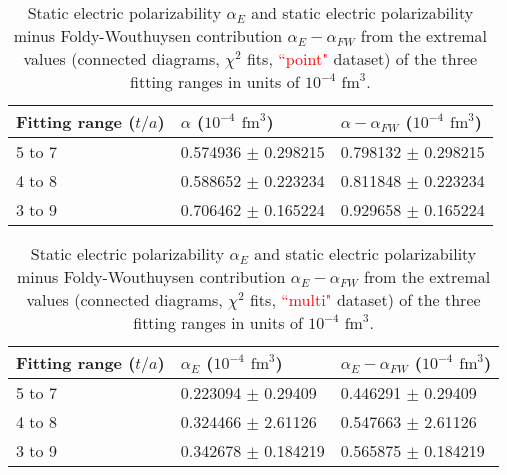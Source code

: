 \begin{table}[H]
\begin{center}
    \begin{tabular}{ | p{2cm}  | p{4cm} | p{4cm} | }
    \hline
     Fitting range ($t/a$) & $\alpha$ ($10^{-4}$ $\text{fm}^3$)    & $\alpha-\alpha_{FW}$ ($10^{-4}$ $\text{fm}^3$)       \\ 
     \hline
     5 to 7 &    0.574936 $\pm$ 0.298215      &   0.798132 $\pm$ 0.298215           \\ \hline
     4 to 8 &   0.588652 $\pm$ 0.223234       &    0.811848 $\pm$ 0.223234          \\ \hline
     3 to 9 &  0.706462 $\pm$ 0.165224        &     0.929658 $\pm$ 0.165224          \\ \hline
    \end{tabular}
\end{center}
\caption{Static electric polarizability  $\alpha_E$ and static electric polarizability minus 
Foldy-Wouthuysen contribution $\alpha_E-\alpha_{FW}$ from the extremal values 
(connected diagrams, $\chi^2$ fits, \textcolor{red}{``point"} dataset) of the three fitting 
ranges in units of $10^{-4}$ $\text{fm}^3$.}
\label{tab:ConnectedPolarizabilitiesPoint}
\end{table}

\begin{table}[H]
\begin{center}
    \begin{tabular}{ | p{2cm}  | p{4cm} | p{4cm} | }
    \hline
     Fitting range ($t/a$) & $\alpha_E$ ($10^{-4}$ $\text{fm}^3$)    & $\alpha_E-\alpha_{FW}$ ($10^{-4}$ $\text{fm}^3$)       \\ 
     \hline
     5 to 7 &    0.223094 $\pm$ 0.29409      &   0.446291 $\pm$ 0.29409           \\ \hline
     4 to 8 &   0.324466 $\pm$ 2.61126       &    0.547663 $\pm$ 2.61126          \\ \hline
     3 to 9 &   0.342678 $\pm$ 0.184219        &      0.565875 $\pm$ 0.184219         \\ \hline
    \end{tabular}
\end{center}
\caption{ Static electric polarizability  $\alpha_E$ and static electric polarizability minus 
Foldy-Wouthuysen contribution $\alpha_E-\alpha_{FW}$ from the extremal values 
(connected diagrams, $\chi^2$ fits, \textcolor{red}{``multi"} dataset) of the three fitting 
ranges in units of $10^{-4}$ $\text{fm}^3$.}
\label{tab:ConnectedPolarizabilitiesMulti}
\end{table}

